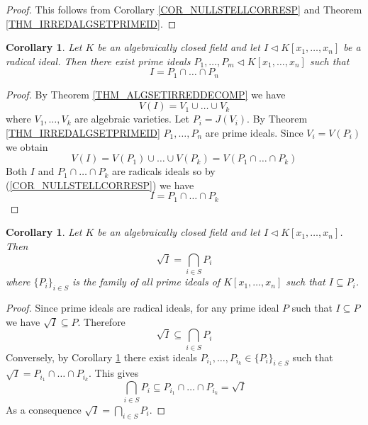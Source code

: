 \documentclass[12pt, letterpaper, oneside]{article}
\theoremstyle{plain}
\newtheorem{corollary}[theorem]{Corollary}
\theoremstyle{definition}
\newcommand{\vs}{\vskip 5mm}
\begin{document}
\vs

\begin{proof}
This follows from Corollary \ref{COR_NULLSTELLCORRESP} and 
Theorem \ref{THM_IRREDALGSETPRIMEID}. 
\end{proof}


\vs\vs


\begin{corollary}
\label{COR_IDISINTEROFPRIMID}
Let $K$ be an algebraically closed field and let $I\lhd K[x_{1}, \dots, x_{n}]$ be 
a radical ideal. Then there exist prime ideals $P_{1}, \dots, P_{m}\lhd K[x_{1}, \dots, x_{n}]$
such that 
$$I= P_{1} \cap \dots \cap P_{n}$$
\end{corollary}

\vs

\begin{proof}
By Theorem \ref{THM_ALGSETIRREDDECOMP} we have 
$$V(I) = V_{1}\cup \dots \cup V_{k}$$
where $V_{1}, \dots, V_{k}$ are algebraic varieties. 
Let $P_{i} = J(V_{i})$. By Theorem \ref{THM_IRREDALGSETPRIMEID} $P_{1}, \dots, P_{n}$
are prime ideals. Since $V_{i} = V(P_{i})$ we obtain 
$$V(I) = V(P_{1}) \cup \dots \cup V(P_{k}) = V(P_{1}\cap \dots \cap P_{k})$$
Both  $I$ and $P_{1}\cap \dots \cap P_{k}$ are radicals ideals so by (\ref{COR_NULLSTELLCORRESP})
we have 
$$I = P_{1}\cap \dots \cap P_{k}$$
\end{proof}


\vs\vs

\begin{corollary}
\label{COR_RADIINTERPRIMEID}
Let $K$ be an algebraically closed field and let $I\lhd K[x_{1}, \dots, x_{n}]$. Then 
$$\sqrt{I} = \bigcap_{i\in S} P_{i}$$
where $\{P_{i}\}_{i\in S}$ is the family of all prime ideals of $K[x_{1}, \dots, x_{n}]$
such that  $I\subseteq P_{i}$. 
\end{corollary}


\vs

\begin{proof}
Since prime ideals are radical ideals, for any prime ideal $P$ such that  $I\subseteq P$ we have
$\sqrt{I} \subseteq P$. Therefore 
$$\sqrt{I} \subseteq \bigcap_{i\in S} P_{i}$$
Conversely, by Corollary \ref{COR_IDISINTEROFPRIMID} there exist ideals 
$P_{i_{1}}, \dots, P_{i_{k}}\in \{P_{i}\}_{i\in S}$ such that  
$\sqrt{I} = P_{i_{1}}\cap \dots \cap P_{i_{k}}$. This gives 
$$\bigcap_{i\in S} P_{i} \subseteq P_{i_{1}}\cap \dots \cap P_{i_{k}} =  \sqrt{I}$$
As a consequence $\sqrt{I} = \bigcap_{i\in S} P_{i} $. 
\end{proof}
\end{document}
